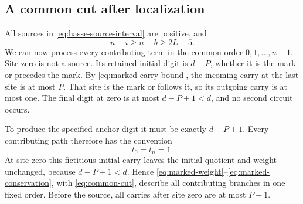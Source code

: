 \subsection{A common cut after localization}

All sources in \eqref{eq:hasse-source-interval} are positive, and
\[
 n-i\ge n-b\ge2L+5.
\]
We can now process every contributing term in the common order
$0,1,\ldots,n-1$. Site zero is not a source. Its retained
initial digit is $d-P$, whether it is the mark or precedes the
mark. By \eqref{eq:marked-carry-bound}, the incoming carry at
the last site is at most $P$. That site is the mark or follows
it, so its outgoing carry is at most one. The final digit at
zero is at most $d-P+1<d$, and no second circuit occurs.

To produce the specified anchor digit it must be exactly
$d-P+1$. Every contributing path therefore has the convention
\begin{equation}
 t_0=t_n=1.
 \label{eq:common-cut}
\end{equation}
At site zero this fictitious initial carry leaves the initial
quotient and weight unchanged, because $d-P+1<d$. Hence
\eqref{eq:marked-weight}--\eqref{eq:marked-conservation}, with
\eqref{eq:common-cut}, describe all contributing branches in
one fixed order. Before the source, all carries after site zero
are at most $P-1$.
